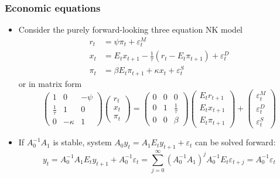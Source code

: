 \documentclass[handout,usepdftitle=false,xcolor=dvipsnames,aspectratio=169]{beamer}
\begin{document}
\begin{frame}
  \frametitle{Economic equations}
  \begin{itemize}
    \item Consider the purely forward-looking three equation NK model
          \begin{align}
            r_t   & = \psi \pi_t + \varepsilon_t^M                                         \\
            x_t   & = E_t x_{t+1} - \frac{1}{\tau} (r_t - E_t \pi_{t+1}) + \varepsilon_t^D \\
            \pi_t & = \beta E_t \pi_{t+1} + \kappa x_t + \varepsilon_t^S
          \end{align}
          or in matrix form
          \begin{equation}
            \begin{pmatrix} 1 & 0 & -\psi \\ \frac{1}{\tau} & 1 & 0 \\ 0 & -\kappa & 1 \end{pmatrix} \begin{pmatrix} r_t \\ x_t \\ \pi_t \end{pmatrix} =  \begin{pmatrix} 0 & 0 & 0 \\ 0 & 1 & \frac{1}{\tau} \\ 0 & 0 & \beta \end{pmatrix} \begin{pmatrix} E_t r_{t+1} \\ E_t x_{t+1} \\ E_t \pi_{t+1} \end{pmatrix} + \begin{pmatrix} \varepsilon_t^M \\ \varepsilon_t^D \\ \varepsilon_t^S \end{pmatrix}
          \end{equation}
    \item If $A_0^{-1}A_1$ is stable, system $A_0y_t=A_1E_ty_{t+1}+\varepsilon_t$ can be solved forward:
          \begin{equation}
            y_t = A_0^{-1}A_1E_ty_{t+1} + A_0^{-1}\varepsilon_t = \sum_{j=0}^{\infty}(A_0^{-1}A_1)^jA_0^{-1}E_t\varepsilon_{t+j} = A_0^{-1}\varepsilon_t
          \end{equation}
  \end{itemize}
\end{frame}
\end{document}
